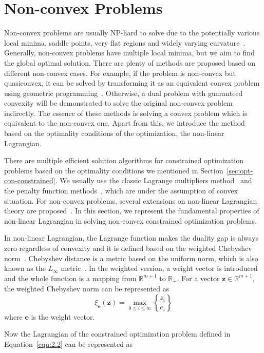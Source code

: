 \section{Non-convex Problems}
\label{sec:non-convex-sol}
Non-convex problems are usually NP-hard to solve due to the potentially various local minima, saddle points, very flat regions and widely varying curvature~\citep{DS:17}. Generally, non-convex problems have multiple local minima, but we aim to find the global optimal solution. There are plenty of methods are proposed based on different non-convex cases. For example, if the problem is non-convex but quasiconvex, it can be solved by transforming it as an equivalent convex problem using geometric programming~\citep{BS:07}. Otherwise, a dual problem with guaranteed convexity will be demonstrated to solve the original non-convex problem indirectly. The essence of these methods is solving a convex problem which is equivalent to the non-convex one. Apart from this, we introduce the method based on the optimality conditions of the optimization, the non-linear Lagrangian.  
\par There are multiple efficient solution algorithms for constrained optimization problems based on the optimality conditions we mentioned in Section~\ref{sec:opt-con-constrained}. We usually use the classic Lagrange multipliers method~\citep{BD:14} and the penalty function methods~\citep{CR:62}, which are under the assumption of convex situation. For non-convex problems, several extensions on non-linear Lagrangian theory are proposed~\cite{LD:95, LD:97, GC:97, XZ:97}. In this section, we represent the fundamental properties of non-linear Lagrangian in solving non-convex constrained optimization problems.
\par In non-linear Lagrangian, the Lagrange function makes the duality gap is always zero regardless of convexity and it is defined based on the weighted Chebyshev norm~\citep{GC:97}. Chebyshev distance is a metric based on the  uniform norm, which is also known as the $L_\infty$ metric~\citep{CC:00}. In the weighted version, a weight vector is introduced and the whole function is a mapping from $\mathbb{R}^{m+1}$ to $\mathbb{R}_{+}$. For a vector $\mathbf{z} \in \mathbb{R}^{m+1}$, the weighted Chebyshev norm can be represented as
\begin{equation}
    \xi_{\mathbf{e}}(\mathbf{z})=\max _{0 \leq i \leq m}\left\{\frac{z_{i}}{e_{i}}\right\}
\end{equation}
where $\mathbf{e}$ is the weight vector. 
\par Now the Lagrangian of the constrained optimization problem defined in Equation~\ref{equ:2.2} can be represented as
